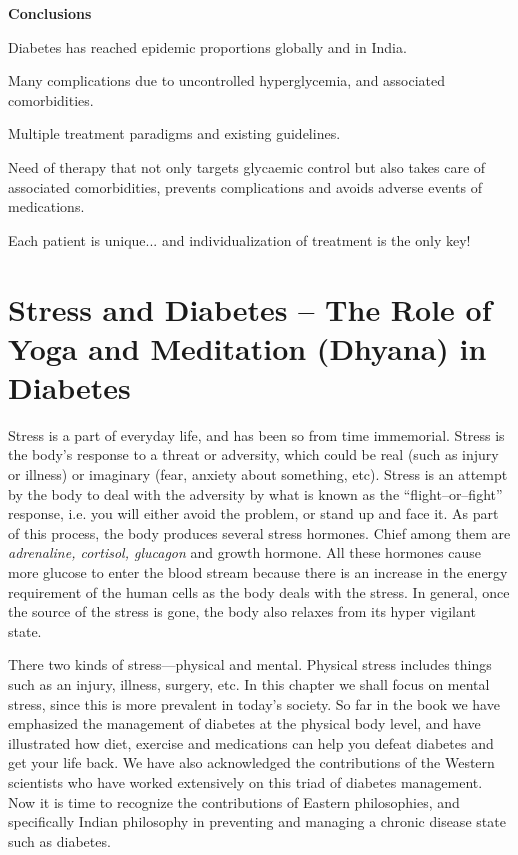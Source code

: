 \textbf{Conclusions}

\item Diabetes has reached epidemic proportions globally and in India.

 \item Many complications due to uncontrolled hyperglycemia, and associated comorbidities.

 \item Multiple treatment paradigms and existing guidelines.

 \item Need of therapy that not only targets glycaemic control but also takes care of associated comorbidities, prevents complications and avoids adverse events of medications.

 \item Each patient is unique... and individualization of treatment is the only key!


\chapter{Stress and Diabetes – The Role of Yoga and Meditation (Dhyana) in Diabetes}\label{chap27}

Stress is a part of everyday life, and has been so from time immemorial. Stress is the body’s response to a threat or adversity, which could be real (such as injury or illness) or imaginary (fear, anxiety about something, etc). Stress is an attempt by the body to deal with the adversity by what is known as the “flight–or–fight” response, i.e. you will either avoid the problem, or stand up and face it. As part of this process, the body produces several stress hormones. Chief among them are \textit{adrenaline, cortisol, glucagon} and growth hormone. All these hormones cause more glucose to enter the blood stream because there is an increase in the energy requirement of the human cells as the body deals with the stress. In general, once the source of the stress is gone, the body also relaxes from its hyper vigilant state.

There two kinds of stress—physical and mental. Physical stress includes things such as an injury, illness, surgery, etc. In this chapter we shall focus on mental stress, since this is more prevalent in today’s society. So far in the book we have emphasized the management of diabetes at the physical body level, and have illustrated how diet, exercise and medications can help you defeat diabetes and get your life back. We have also acknowledged the contributions of the Western scientists who have worked extensively on this triad of diabetes management. Now it is time to recognize the contributions of Eastern philosophies, and specifically Indian philosophy in preventing and managing a chronic disease state such as diabetes.

